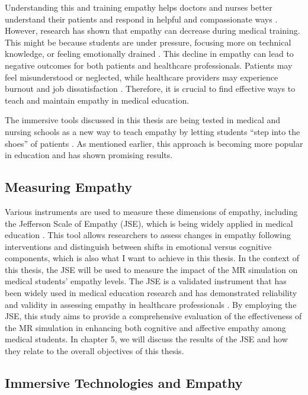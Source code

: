 Understanding this and training empathy helps doctors and nurses better understand their patients and respond in helpful and compassionate ways \cite{Ozcan2018, Olson1995}. However, research has shown that empathy can decrease during medical training. This might be because students are under pressure, focusing more on technical knowledge, or feeling emotionally drained \cite{Mattsson2024, Ozcan2018}. This decline in empathy can lead to negative outcomes for both patients and healthcare professionals. Patients may feel misunderstood or neglected, while healthcare providers may experience burnout and job dissatisfaction \cite{Mattsson2024, Cunico2012}. Therefore, it is crucial to find effective ways to teach and maintain empathy in medical education.

The immersive tools discussed in this thesis are being tested in medical and nursing schools as a new way to teach empathy by letting students “step into the shoes” of patients \cite{Alieldin2024}. As mentioned earlier, this approach is becoming more popular in education and has shown promising results.

\subsection{Measuring Empathy}

Various instruments are used to measure these dimensions of empathy, including the Jefferson Scale of Empathy (JSE), which is being widely applied in medical education \cite{Alieldin2024}. This tool allows researchers to assess changes in empathy following interventions and distinguish between shifts in emotional versus cognitive components, which is also what I want to achieve in this thesis. In the context of this thesis, the JSE will be used to measure the impact of the MR simulation on medical students' empathy levels. The JSE is a validated instrument that has been widely used in medical education research and has demonstrated reliability and validity in assessing empathy in healthcare professionals \cite{Hojat2002}. By employing the JSE, this study aims to provide a comprehensive evaluation of the effectiveness of the MR simulation in enhancing both cognitive and affective empathy among medical students. In chapter 5, we will discuss the results of the JSE and how they relate to the overall objectives of this thesis.

\subsection{Immersive Technologies and Empathy}


